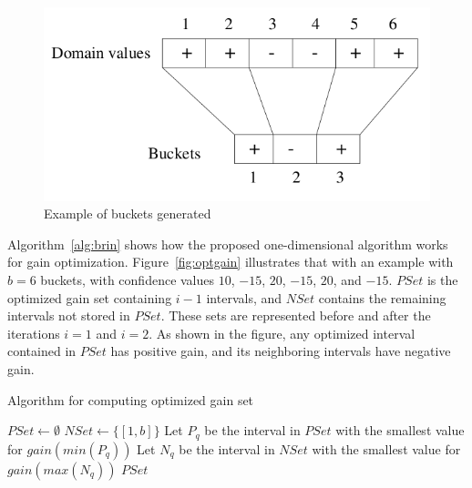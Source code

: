 \begin{figure}
\begin{center}
  \includegraphics[width=0.5\linewidth]{./Figures/brin-bucket.png}
\end{center}
\caption{Example of buckets generated~\citep{Brin99miningoptimized}}
\label{fig:brinbucket}
\end{figure}

Algorithm~\ref{alg:brin} shows how the proposed one-dimensional algorithm works for gain optimization.
Figure~\ref{fig:optgain} illustrates that with an example with $b=6$ buckets, with confidence values $10$, $-15$, $20$,
$-15$, $20$, and $-15$. $PSet$ is the optimized gain set containing $i-1$ intervals, and $NSet$ contains the
remaining intervals not stored in $PSet$. These sets are represented before and after the iterations $i=1$ and $i=2$.
As shown in the figure, any optimized interval contained in $PSet$ has positive gain, and its neighboring intervals
have negative gain.

\begin{algorithm}[h!]
 \caption{Algorithm for computing optimized gain set~\citep{Brin99miningoptimized}}
 \label{alg:brin}
  $PSet \leftarrow \emptyset$\;
  $NSet \leftarrow \{[1,b]\}$\;
   {
      Let $P_q$ be the interval in $PSet$ with the smallest value for $gain(min(P_q))$\;
      Let $N_q$ be the interval in $NSet$ with the smallest value for $gain(max(N_q))$\;
  }
  \Return $PSet$\;
\end{algorithm}

